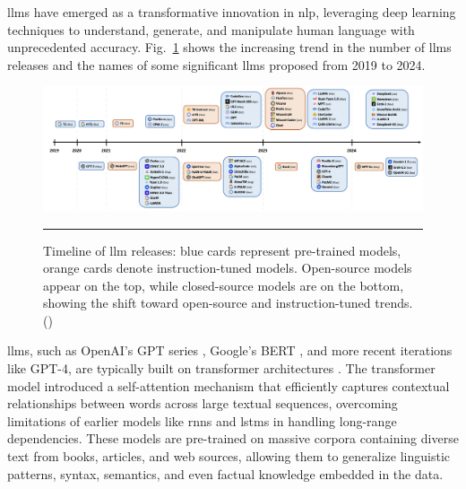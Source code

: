 \glspl{llm} have emerged as a transformative innovation in \gls{nlp}, leveraging deep learning techniques to understand, generate, and manipulate human language with unprecedented accuracy.
Fig.~\ref{fig:llms-over-the-years} shows the increasing trend in the number of \glspl{llm} releases and the names of some significant \glspl{llm} proposed from 2019 to 2024.

\begin{figure}[htbp]
    \centering
 \includegraphics[width=\textwidth]{03_Figures/literature-review/llms-over-the-years.png}
     \rule{35em}{0.5pt}
    \caption{Timeline of \gls{llm} releases: blue cards represent pre-trained models, orange cards denote instruction-tuned models. Open-source models appear on the top, while closed-source models are on the bottom, showing the shift toward open-source and instruction-tuned trends. (\textcite{Naveed2023})}
 \label{fig:llms-over-the-years}
\end{figure}

\glspl{llm}, such as OpenAI's GPT series \cite{Radford2018ImprovingLU}, Google's BERT \cite{Devlin2019BERTPO}, and more recent iterations like GPT-4, are typically built on transformer architectures \cite{Vaswani2017}.
The transformer model introduced a self-attention mechanism that efficiently captures contextual relationships between words across large textual sequences, overcoming limitations of earlier models like \glspl{rnn} and \glspl{lstm} in handling long-range dependencies.
These models are pre-trained on massive corpora containing diverse text from books, articles, and web sources, allowing them to generalize linguistic patterns, syntax, semantics, and even factual knowledge embedded in the data.

